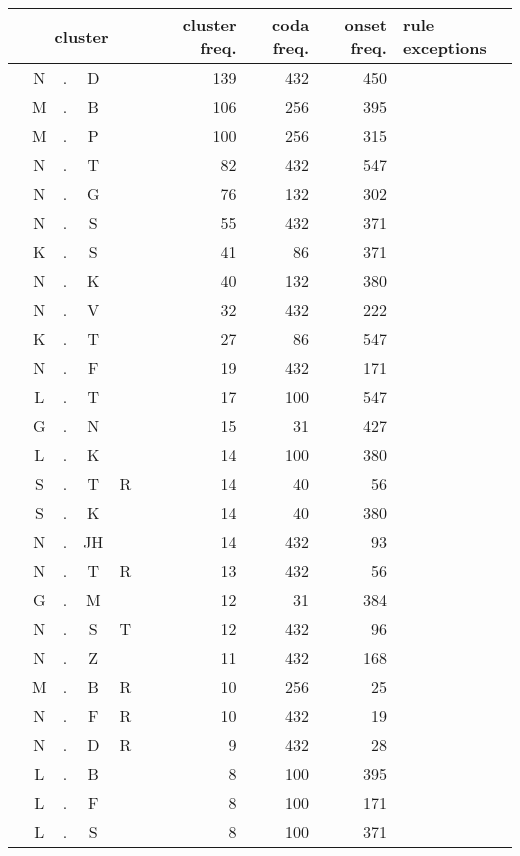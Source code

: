 \begin{center}
\begin{longtable}{c@{ } c@{ } c@{ } c@{ } c@{ } c@{ } r r r l }
\toprule
\multicolumn{6}{c}{cluster} & cluster freq. & coda freq. & onset freq. & rule exceptions \\
\midrule
  & N  & . & D  &   &   & 139 & 432 & 450 &  \\ 
  & M  & . & B  &   &   & 106 & 256 & 395 &  \\ 
  & M  & . & P  &   &   & 100 & 256 & 315 &  \\ 
  & N  & . & T  &   &   & 82 & 432 & 547 &  \\ 
  & N  & . & G  &   &   & 76 & 132 & 302 &  \\ 
  & N  & . & S  &   &   & 55 & 432 & 371 &  \\ 
  & K  & . & S  &   &   & 41 & 86 & 371 &  \\ 
  & N  & . & K  &   &   & 40 & 132 & 380 &  \\ 
  & N  & . & V  &   &   & 32 & 432 & 222 &  \\ 
  & K  & . & T  &   &   & 27 & 86 & 547 &  \\ 
  & N  & . & F  &   &   & 19 & 432 & 171 &  \\ 
  & L  & . & T  &   &   & 17 & 100 & 547 &  \\ 
  & G  & . & N  &   &   & 15 & 31 & 427 &  \\ 
  & L  & . & K  &   &   & 14 & 100 & 380 &  \\ 
  & S  & . & T  & R &   & 14 & 40 & 56 &  \\ 
  & S  & . & K  &   &   & 14 & 40 & 380 &  \\ 
  & N  & . & JH &   &   & 14 & 432 & 93 &  \\ 
  & N  & . & T  & R &   & 13 & 432 & 56 &  \\ 
  & G  & . & M  &   &   & 12 & 31 & 384 &  \\ 
  & N  & . & S  & T &   & 12 & 432 & 96 &  \\ 
  & N  & . & Z  &   &   & 11 & 432 & 168 &  \\ 
  & M  & . & B  & R &   & 10 & 256 & 25 &  \\ 
  & N  & . & F  & R &   & 10 & 432 & 19 &  \\ 
  & N  & . & D  & R &   & 9 & 432 & 28 &  \\ 
  & L  & . & B  &   &   & 8 & 100 & 395 &  \\ 
  & L  & . & F  &   &   & 8 & 100 & 171 &  \\ 
  & L  & . & S  &   &   & 8 & 100 & 371 &  \\ 

\end{longtable}
\end{center}
